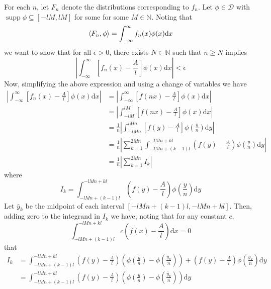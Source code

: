 \documentclass{article}
\DeclareMathOperator\supp{supp}
\begin{document}
For each $n$, let $F_n$ denote the distributions corresponding to $f_n$.
Let $\phi \in \mathcal{D}$ with $\supp \phi \subseteq [-l M, l M]$ for
some for some $M \in \mathbb{N}$. Noting that
%
\begin{equation*}
    \langle F_n, \phi \rangle
        = \int_{-\infty}^{\infty} f_n(x) \phi(x) \mathrm{d} x \\
\end{equation*}
%
we want to show that for all $\epsilon > 0$, there exists
$N \in \mathbb{N}$ such that $n \geq N$ implies
%
\begin{equation*}
    \left| \int_{-\infty}^{\infty} \left[ f_n(x) - \frac{A}{l} \right] \phi(x) \mathrm{d} x \right| < \epsilon
\end{equation*}
%
Now, simplifying the above expression and using a change of variables we have
%
\begin{align*}
    \left| \int_{-\infty}^{\infty} \left[ f_n(x) - \frac{A}{l} \right] \phi(x) \mathrm{d} x \right|
        &=\left| \int_{-\infty}^{\infty} \left[ f(n x) - \frac{A}{l} \right] \phi(x) \mathrm{d} x \right| \\
        &= \left| \int_{-l M}^{l M} \left[ f(n x) - \frac{A}{l} \right] \phi(x) \mathrm{d} x \right| \\
        &= \frac{1}{n} \left| \int_{-l M n}^{l M n} \left[ f(y) - \frac{A}{l} \right] \phi\left(\frac{y}{n}\right) \mathrm{d} y \right| \\
        &= \frac{1}{n} \left| \sum_{k = 1}^{2 M n} \int_{-l M n + (k - 1) l}^{- l M n + k l} \left( f(y) - \frac{A}{l} \right) \phi\left(\frac{y}{n}\right) \mathrm{d} y \right| \\
        &= \frac{1}{n} \left| \sum_{k = 1}^{2 M n} I_k \right|
\end{align*}
%
where
%
\begin{equation*}
    I_k = \int_{-l M n + (k - 1) l}^{- l M n + k l} \left( f(y) - \frac{A}{l} \right) \phi\left(\frac{y}{n}\right) \mathrm{d} y
\end{equation*}
%
Let $\bar{y}_k$ be the midpoint of each interval
$[- l M n + (k - 1) l, - l M n + k l]$. Then, adding zero to the
integrand in $I_k$ we have, noting that for any constant $c$,
%
\begin{equation*}
    \int_{-l M n + (k - 1) l}^{- l M n + k l} c \left( f(x) - \frac{A}{l} \right) \mathrm{d} x = 0
\end{equation*}
%
that
%
\begin{align*}
    I_k &= \int_{-l M n + (k - 1) l}^{- l M n + k l}
            \left( f(y) - \frac{A}{l} \right) \left( \phi\left(\frac{y}{n}\right) - \phi\left(\frac{\bar{y}_k}{n}\right) \right)
            + \left( f(y) - \frac{A}{l} \right) \phi\left(\frac{\bar{y}_k}{n}\right)
           \mathrm{d} y \\
        &= \int_{-l M n + (k - 1) l}^{- l M n + k l}
            \left( f(y) - \frac{A}{l} \right) \left( \phi\left(\frac{y}{n}\right) - \phi\left(\frac{\bar{y}_k}{n}\right) \right)
           \mathrm{d} y
\end{align*}
\end{document}
